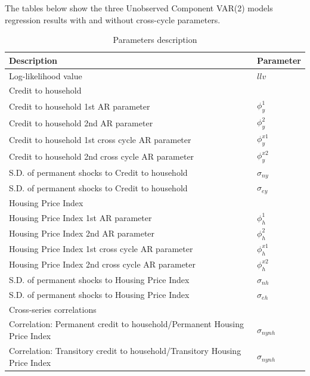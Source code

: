 \documentclass[12pt]{article}
\begin{document}
\begin{outline}[enumerate]
		The tables below show the three Unobserved Component VAR(2) models regression results with and without cross-cycle parameters.
		
		\begin{table}[]
			\begin{threeparttable}
				\caption {\label{tab:table1} Parameters description}
				\begin{tabular}{@{}ll@{}}
					\toprule
					Description & Parameter\\
					\midrule
					Log-likelihood value & $llv$ \\[2pt] 
					Credit to household & \\
					\quad Credit to household 1st AR parameter  & $\phi^1_{y}$ \\[2pt] 
					\quad Credit to household 2nd AR parameter  & $\phi^2_{y}$ \\[2pt] 
					\quad Credit to household 1st cross cycle AR parameter  & $\phi^{x1}_{y}$ \\[2pt] 
					\quad Credit to household 2nd cross cycle AR parameter  & $\phi^{x2}_{y}$ \\[2pt] 
					\quad S.D. of permanent shocks to Credit to household & $\sigma_{ny}$ \\[2pt] 
					\quad S.D. of permanent shocks to Credit to household & $\sigma_{ey}$ \\[2pt]
					Housing Price Index & \\
					\quad Housing Price Index 1st AR parameter  & $\phi^1_{h}$ \\[2pt] 
					\quad Housing Price Index 2nd AR parameter  & $\phi^2_{h}$ \\[2pt] 
					\quad Housing Price Index 1st cross cycle AR parameter  & $\phi^{x1}_{h}$ \\[2pt] 
					\quad Housing Price Index 2nd cross cycle AR parameter  & $\phi^{x2}_{h}$ \\[2pt] 
					\quad S.D. of permanent shocks to Housing Price Index & $\sigma_{nh}$ \\[2pt] 
					\quad S.D. of permanent shocks to Housing Price Index & $\sigma_{eh}$ \\[2pt]
					Cross-series correlations & \\
					\quad Correlation: Permanent credit to household/Permanent Housing Price Index  & $\sigma_{nynh}$ \\[2pt] 
					\quad Correlation: Transitory credit to household/Transitory Housing Price Index  & $\sigma_{nynh}$ \\[2pt] 
										

\end{tabular}
\end{threeparttable}
\end{table}
\end{outline}
\end{document}
